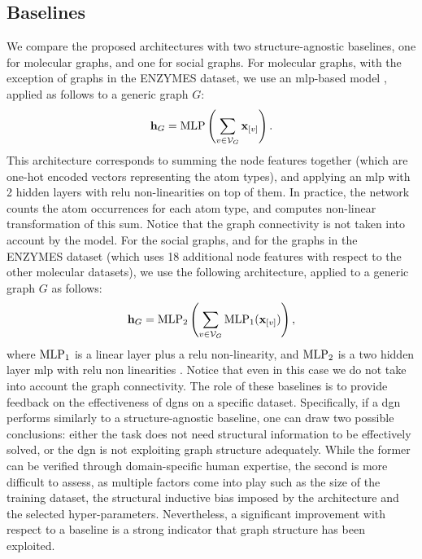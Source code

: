 \subsection{Baselines}
We compare the proposed architectures with two structure-agnostic baselines, one for molecular graphs, and one for social graphs. For molecular graphs, with the exception of graphs in the ENZYMES dataset, we use an \gls{mlp}-based model \citep{ralaivola2005graphkernels}, applied as follows to a generic graph $G$:
$$\Vector{h}_G = \Fun{MLP}\Paren{\sum_{v \in \Cal{V}_G} \Elem{x}{v}}.$$
This architecture corresponds to summing the node features together (which are one-hot encoded vectors representing the atom types), and applying an \gls{mlp} with 2 hidden layers with \gls{relu} non-linearities on top of them. In practice, the network counts the atom occurrences for each atom type, and computes non-linear transformation of this sum. Notice that the graph connectivity is not taken into account by the model.
For the social graphs, and for the graphs in the ENZYMES dataset (which uses 18 additional node features with respect to the other molecular datasets), we use the following architecture, applied to a generic graph $G$ as follows:
$$\Vector{h}_G = \Fun{MLP}_2\Paren{\sum_{v \in \Cal{V}_G} \Fun{MLP}_1(\Elem{x}{v})},$$
where $\mathrm{MLP}_1$ is a linear layer plus a \gls{relu} non-linearity, and $\mathrm{MLP}_2$ is a two hidden layer \gls{mlp} with \gls{relu} non linearities \citep{zaheer2017deepsets}. Notice that even in this case we do not take into account the graph connectivity. The role of these baselines is to provide feedback on the effectiveness of \glspl{dgn} on a specific dataset. Specifically, if a \gls{dgn} performs similarly to a structure-agnostic baseline, one can draw two possible conclusions: either the task does not need structural information to be effectively solved, or the \gls{dgn} is not exploiting graph structure adequately. While the former can be verified through domain-specific human expertise, the second is more difficult to assess, as multiple factors come into play such as the size of the training dataset, the structural inductive bias imposed by the architecture and the selected hyper-parameters. Nevertheless, a significant improvement with respect to a baseline is a strong indicator that graph structure has been exploited.

